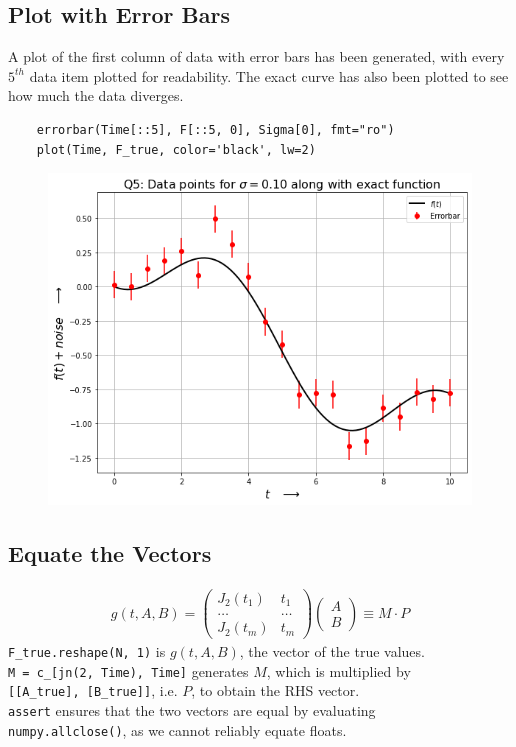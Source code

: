 \documentclass[12pt, a4paper]{article}
\begin{document}
\subsection{Plot with Error Bars}
A plot of the first column of data with error bars has been generated, with every
$5^{th}$ data item plotted for readability. The exact curve has also been plotted
to see how much the data diverges.
\begin{verbatim}
    errorbar(Time[::5], F[::5, 0], Sigma[0], fmt="ro")
    plot(Time, F_true, color='black', lw=2)
\end{verbatim}
\begin{figure}[H]
    \centering
    \includegraphics[scale=0.6]{Q5.png}
\end{figure}


\subsection{Equate the Vectors}
\begin{gather}
    g(t,A,B) =
    \begin{pmatrix}
        J_2(t_1) & t_1   \\
        \dots    & \dots \\
        J_2(t_m) & t_m
    \end{pmatrix}
    \begin{pmatrix}
        A \\ B
    \end{pmatrix}
    \equiv
    M \cdot P
    \label{eq:M}
\end{gather}
\texttt{F\_true.reshape(N, 1)} is $g(t,A,B)$, the vector of the true values. \\
\texttt{M = c\_[jn(2, Time), Time]} generates $M$, which is multiplied by \\
\texttt{[[A\_true], [B\_true]]}, i.e. $P$, to obtain the RHS vector.\\
\texttt{assert} ensures that the two vectors are equal by evaluating \\
\texttt{numpy.allclose()}, as we cannot reliably equate floats.
\end{document}
